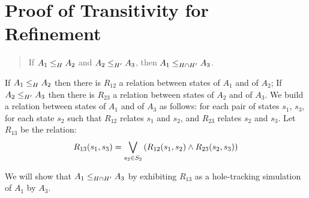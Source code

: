 \documentclass[runningheads]{llncs}
\begin{document}
\appendix

\section{Proof of Transitivity for Refinement}\label{sec:proof-transitivity}
\begin{quote}
If $\wrel{A_1}{A_2}{H}$ and $\wrel{A_2}{A_3}{H'}$, then $\wrel{A_1}{A_3}{H\cap H'}$.
\end{quote}
\proof 
If $\wrel{A_1}{A_2}{H}$ then there is $R_{12}$ a relation between states
of $A_1$ and of $A_2$;  If $\wrel{A_2}{A_3}{H'}$ then there is $R_{23}$ a relation between states of $A_2$ and of $A_3$. We build a relation between
 states of $A_1$ and of $A_3$ as follows:  for each pair of states $s_1$, $s_3$, for each state $s_2$ such that $R_{12}$ relates $s_1$ and $s_2$, and $R_{23}$ relates $s_2$ and $s_3$.
Let $R_{13}$ be the relation:\\
  \[R_{13}(s_1,s_3)=\bigvee_{s_2\in S_2}\mpar{R_{12}(s_1,s_2) \land R_{23}(s_2,s_3) } \]

We will show that $\wrel{A_1}{A_3}{H\cap H'}$ by exhibiting  $R_{13}$ as a hole-tracking simulation of $A_1$ by  $A_3$.
\end{document}
